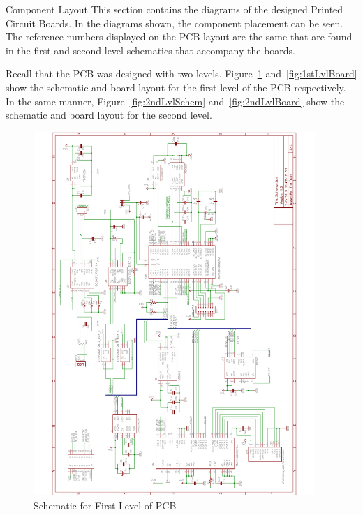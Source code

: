 \begin{customAppendixPage}{Component Layout}
This section contains the diagrams of the designed Printed Circuit Boards.  In the diagrams shown, the component placement can be seen.  The reference numbers displayed on the PCB layout are the same that are found in the first and second level schematics that accompany the boards.

Recall that the PCB was designed with two levels.  Figure~\ref{fig:1stLvlSchem} and~\ref{fig:1stLvlBoard} show the schematic and board layout for the first level of the PCB respectively. In the same manner, Figure~\ref{fig:2ndLvlSchem} and~\ref{fig:2ndLvlBoard} show the schematic and board layout for the second level.
\end{customAppendixPage}
\renewcommand*{\thepage}{\thesection-\arabic{page}}


\begin{figure}[H]
	\centering
	\includegraphics[width=0.95\textwidth]{img/1stLvlSchem}
	\caption{Schematic for First Level of PCB \label{fig:1stLvlSchem}}
\end{figure}

